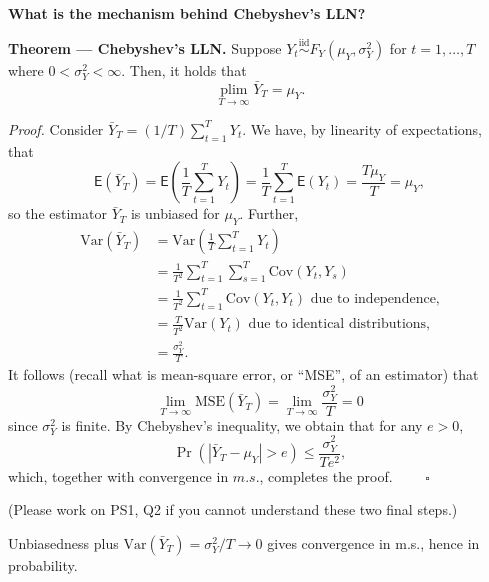 \documentclass[
  letterpaper,
  DIV=11,
  numbers=noendperiod]{scrartcl}
\newcommand{\slidelabel}[1]{{\color{embernavy}\bfseries\large #1\par\vspace{5pt}}}
\newenvironment{slidefooter}{%
  \par\vspace{7pt}{\color{emberrule}\rule{\linewidth}{0.4pt}}\par\vspace{4pt}%
  \color{emberamber}\itshape\small}{\par}
\begin{document}
\begin{slidebox}

\slidelabel{What is the mechanism behind Chebyshev's LLN?}

\textbf{Theorem --- Chebyshev's LLN.} Suppose
\(Y_t \overset{\scriptscriptstyle\text{iid}}{\sim} F_Y(\mu_Y, \sigma_Y^2)\)
for \(t = 1,\ldots,T\) where \(0 < \sigma_Y^2 < \infty\). Then, it holds
that \[\operatorname*{plim}_{T\to\infty}\bar{Y}_T = \mu_Y.\]

\emph{Proof.} Consider \(\bar{Y}_T = (1/T)\sum_{t=1}^{T} Y_t\). We have,
by linearity of expectations, that
\[\mathsf{E}(\bar{Y}_T) = \mathsf{E}\!\left(\frac{1}{T}\sum_{t=1}^{T} Y_t\right) = \frac{1}{T}\sum_{t=1}^{T}\mathsf{E}(Y_t) = \frac{T\mu_Y}{T} = \mu_Y,\]
so the estimator \(\bar{Y}_T\) is unbiased for \(\mu_Y\). Further,
\[\begin{aligned} \text{Var}(\bar{Y}_T) &= \text{Var}\!\left(\frac{1}{T}\sum_{t=1}^{T} Y_t\right) \\ &= \frac{1}{T^2}\sum_{t=1}^{T}\sum_{s=1}^{T}\text{Cov}(Y_t, Y_s) \\ &= \frac{1}{T^2}\sum_{t=1}^{T}\text{Cov}(Y_t, Y_t) \text{ due to independence,} \\ &= \frac{T}{T^2}\text{Var}(Y_t) \text{ due to identical distributions,} \\ &= \frac{\sigma_Y^2}{T}. \end{aligned}\]
It follows (recall what is mean-square error, or ``MSE'', of an
estimator) that
\[\lim_{T\to\infty}\text{MSE}(\bar{Y}_T) = \lim_{T\to\infty}\frac{\sigma_Y^2}{T} = 0\]
since \(\sigma_Y^2\) is finite. By Chebyshev's inequality, we obtain
that for any \(e > 0\),
\[\Pr\!\left(\left|\bar{Y}_T - \mu_Y\right| > e\right) \leq \frac{\sigma_Y^2}{Te^2},\]
which, together with convergence in \(m.s.\), completes the proof.
\(\qquad\square\)

(Please work on PS1, Q2 if you cannot understand these two final steps.)

\begin{slidefooter}

Unbiasedness plus \(\text{Var}(\bar{Y}_T) = \sigma^2_Y/T \to 0\) gives
convergence in m.s., hence in probability.

\end{slidefooter}

\end{slidebox}
\end{document}
